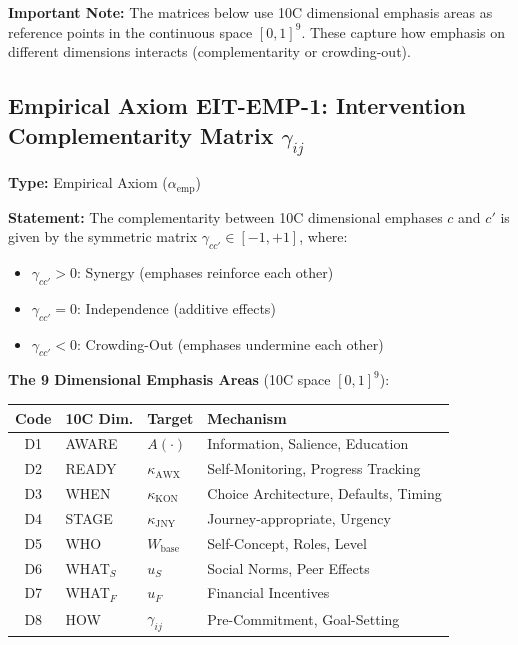 \textbf{Important Note:} The matrices below use 10C dimensional emphasis areas as reference points in the continuous space $[0,1]^9$. These capture how emphasis on different dimensions interacts (complementarity or crowding-out).

\subsection{Empirical Axiom EIT-EMP-1: Intervention Complementarity Matrix $\gamma_{ij}$}
\label{sec:ie-gamma-matrix}

\begin{tcolorbox}[colback=blue!5!white, colframe=blue!75!black,
    title=\textbf{Empirical Axiom EIT-EMP-1: Complementarity Matrix $\gamma_{ij}$}]

\textbf{Type:} Empirical Axiom ($\alpha_{\text{emp}}$)

\textbf{Statement:} The complementarity between 10C dimensional emphases $c$ and $c'$ is given by the symmetric matrix $\gamma_{cc'} \in [-1, +1]$, where:
\begin{itemize}[nosep]
    \item $\gamma_{cc'} > 0$: Synergy (emphases reinforce each other)
    \item $\gamma_{cc'} = 0$: Independence (additive effects)
    \item $\gamma_{cc'} < 0$: Crowding-Out (emphases undermine each other)
\end{itemize}

\textbf{The 9 Dimensional Emphasis Areas} (10C space $[0,1]^9$):
\begin{center}
\small
\begin{tabular}{@{}clll@{}}
\toprule
\textbf{Code} & \textbf{10C Dim.} & \textbf{Target} & \textbf{Mechanism} \\
\midrule
D1 & AWARE & $A(\cdot)$ & Information, Salience, Education \\
D2 & READY & $\kappa_{\text{AWX}}$ & Self-Monitoring, Progress Tracking \\
D3 & WHEN & $\kappa_{\text{KON}}$ & Choice Architecture, Defaults, Timing \\
D4 & STAGE & $\kappa_{\text{JNY}}$ & Journey-appropriate, Urgency \\
D5 & WHO & $W_{\text{base}}$ & Self-Concept, Roles, Level \\
D6 & WHAT$_S$ & $u_S$ & Social Norms, Peer Effects \\
D7 & WHAT$_F$ & $u_F$ & Financial Incentives \\
D8 & HOW & $\gamma_{ij}$ & Pre-Commitment, Goal-Setting \\
\bottomrule
\end{tabular}
\end{center}

\end{tcolorbox}

